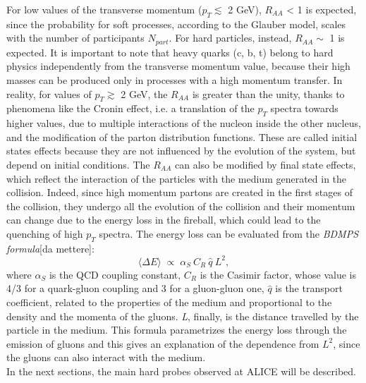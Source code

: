 For low values of the transverse momentum ($p_{T} \lesssim$ 2 GeV), $R_{AA}$ < 1 is expected, since the probability for soft processes, according to the Glauber model, scales with the number of participants $N_{part}$. For hard particles, instead, $R_{AA} \sim$ 1 is expected. It is important to note that heavy quarks (c, b, t) belong to hard physics independently from the transverse momentum value, because their high masses can be produced only in processes with a high momentum transfer. In reality, for values of $p_{T} \gtrsim$ 2 GeV, the $R_{AA}$ is greater than the unity, thanks to phenomena like the Cronin effect, i.e. a translation of the $p_{T}$ spectra towards higher values, due to multiple interactions of the nucleon inside the other nucleus, and the modification of the parton distribution functions. These are called initial states effects because they are not influenced by the evolution of the system, but depend on initial conditions. The $R_{AA}$ can also be modified by final state effects, which reflect the interaction of the particles with the medium generated in the collision. Indeed, since high momentum partons are created in the first stages of the collision, they undergo all the evolution of the collision and their momentum can change due to the energy loss in the fireball, which could lead to the quenching of high $p_{T}$ spectra. The energy loss can be evaluated from the \textit{BDMPS formula}[da mettere]:
\begin{equation}
 \langle \Delta E \rangle \;\propto\;\alpha_{S} \:C_{R}\: \hat{q}\: L^{2},
\end{equation}
where $\alpha_{S}$ is the QCD coupling constant, $C_{R}$ is the Casimir factor, whose value is 4/3 for a quark-gluon coupling and 3 for a gluon-gluon 
one, $\hat{q}$ is the transport coefficient, related to the properties of the medium and proportional to the density and the momenta of the gluons. \textit{L}, finally, is the distance travelled by the particle in the medium. This formula parametrizes the energy loss through the emission of gluons and this gives an explanation of the dependence from $L^{2}$, since the gluons can also interact with the medium.\\
In the next sections, the main hard probes observed at ALICE will be described.\\
